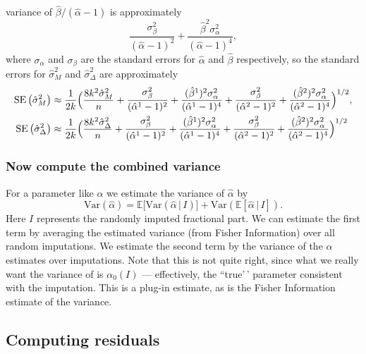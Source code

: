 \documentclass[
]{article}
\begin{document}
variance of \(\hat\beta/(\hat\alpha-1)\) is approximately \[
  \frac{\sigma_\beta^2}{(\hat\alpha-1)^2} + \frac{\hat\beta^2\sigma_\alpha^2}{(\hat\alpha-1)^4},
\] where \(\sigma_\alpha\) and \(\sigma_\beta\) are the standard errors
for \(\hat\alpha\) and \(\hat\beta\) respectively, so the standard
errors for \(\hat\sigma_M^2\) and \(\hat\sigma_\Delta^2\) are
approximately \begin{align*}
  \operatorname{SE}\left(\hat\sigma_M^2\right)&\approx \frac{1}{2k}\Bigl(\frac{8k^2\hat\sigma_M^2}{n} + \frac{\sigma_\beta^2}{(\hat\alpha^1-1)^2} + \frac{(\hat\beta^1)^2\sigma_\alpha^2}{(\hat\alpha^1-1)^4} + \frac{\sigma_\beta^2}{(\hat\alpha^2-1)^2} + \frac{(\hat\beta^2)^2\sigma_\alpha^2}{(\hat\alpha^2-1)^4} \Bigr)^{1/2},\\
  \operatorname{SE}\left(\hat\sigma_\Delta^2\right)&\approx \frac{1}{2k}\Bigl(\frac{8k^2\hat\sigma_\Delta^2}{n} + \frac{\sigma_\beta^2}{(\hat\alpha^1-1)^2} + \frac{(\hat\beta^1)^2\sigma_\alpha^2}{(\hat\alpha^1-1)^4} + \frac{\sigma_\beta^2}{(\hat\alpha^2-1)^2} + \frac{(\hat\beta^2)^2\sigma_\alpha^2}{(\hat\alpha^2-1)^4} \Bigr)^{1/2}
\end{align*}

\hypertarget{now-compute-the-combined-variance}{%
\subsubsection{Now compute the combined
variance}\label{now-compute-the-combined-variance}}

For a parameter like \(\alpha\) we estimate the variance of
\(\hat\alpha\) by \newcommand{\E}{\mathbb{E}}
\renewcommand{\P}{\mathbb{P}} \[
  \mathrm{Var}(\hat\alpha) = \mathbb{E}\bigl[ \mathrm{Var}\left(\hat\alpha\, |\, I\right)\bigr] + \mathrm{Var}\left(\mathbb{E} \left[ \hat\alpha\, |\, I \right]\right).
\] Here \(I\) represents the randomly imputed fractional part. We can
estimate the first term by averaging the estimated variance (from Fisher
Information) over all random imputations. We estimate the second term by
the variance of the \(\alpha\) estimates over imputations. Note that
this is not quite right, since what we really want the variance of is
\(\alpha_0(I)\) --- effectively, the ``true'\,' parameter consistent
with the imputation. This is a plug-in estimate, as is the Fisher
Information estimate of the variance.

\hypertarget{computing-residuals}{%
\subsection{Computing residuals}\label{computing-residuals}}
\end{document}
